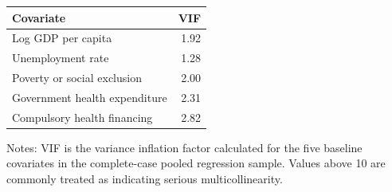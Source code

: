 \begin{tabular}{@{}lr@{}}
\toprule
Covariate & VIF \\
\midrule
Log GDP per capita & 1.92 \\
Unemployment rate & 1.28 \\
Poverty or social exclusion & 2.00 \\
Government health expenditure & 2.31 \\
Compulsory health financing & 2.82 \\
\bottomrule
\end{tabular}
\par\vspace{0.3em}
\begin{minipage}{0.86\textwidth}
\footnotesize Notes: VIF is the variance inflation factor calculated for the five baseline covariates in the complete-case pooled regression sample. Values above 10 are commonly treated as indicating serious multicollinearity.
\end{minipage}
